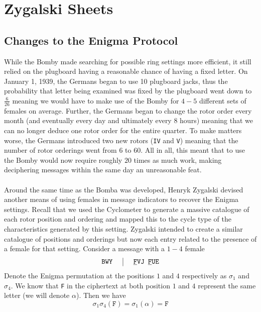 \section{Zygalski Sheets}

\subsection{Changes to the Enigma Protocol}
While the Bomby made searching for possible ring settings more efficient, it still relied on the plugboard having a reasonable chance of having a fixed letter. On January 1, 1939, the Germans began to use 10 plugboard jacks, thus the probability that letter being examined was fixed by the plugboard went down to $\frac{6}{26}$ meaning we would have to make use of the Bomby for $4-5$ different sets of females on average. Further, the Germans began to change the rotor order every month (and eventually every day and ultimately every 8 hours) meaning that we can no longer deduce one rotor order for the entire quarter. To make matters worse, the Germans introduced two new rotors (\texttt{IV} and \texttt{V}) meaning that the number of rotor orderings went from $6$ to $60$. All in all, this meant that to use the Bomby would now require roughly $20$ times as much work, making deciphering messages within the same day an unreasonable feat.
\\\\Around the same time as the Bomba was developed, Henryk Zygalski devised another means of using females in message indicators to recover the Enigma settings. Recall that we used the Cyclometer to generate a massive catalogue of each rotor position and ordering and mapped this to the cycle type of the characteristics generated by this setting. Zygalski intended to create a similar catalogue of positions and orderings but now each entry related to the presence of a female for that setting. Consider a message with a $1-4$ female
\[
	\setlength{\arraycolsep}{15pt}
	\begin{array}{c | c}
		\texttt{BWY} & {\uline{\texttt{F}}}\texttt{VJ }{\uline{\texttt{F}}}\texttt{UE} \\
	\end{array}
\]
Denote the Enigma permutation at the positions $1$ and $4$ respectively as $\sigma_1$ and $\sigma_4$. We know that \texttt{F} in the ciphertext at both position $1$ and $4$ represent the same letter (we will denote $\alpha$). Then we have
\[
	\sigma_1\sigma_4(\texttt{F}) = \sigma_1(\alpha) = \texttt{F}
\]
